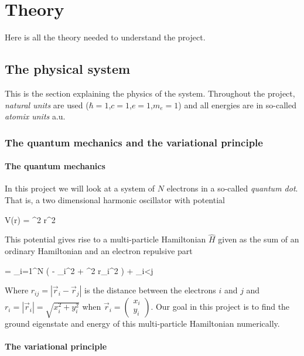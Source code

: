 \section{Theory}
Here is all the theory needed to understand the project.


\subsection{The physical system}
This is the section explaining the physics of the system. 
Throughout the project, \textit{natural units} are used ($\hbar = 1$,$c=1$,$e=1$,$m_e=1$) and all energies are in so-called \textit{atomix units} a.u. 

\subsubsection{The quantum mechanics and the variational principle} \label{sec:quantum_mechanics}

\paragraph{The quantum mechanics}

In this project we will look at a system of $N$ electrons in a so-called \textit{quantum dot}.
That is, a two dimensional harmonic oscillator with potential 

\eqs
V(\vec r) =  \omega^2 r^2
\label{eq:harmonic_oscillator_potential}
\eqf

This potential gives rise to a multi-particle Hamiltonian $\hat{H}$ given as the sum of an ordinary Hamiltonian and an electron repulsive part

\eqs
{} = \sum_{i=1}^N \left ( - \nabla_i^2 +  \omega^2 r_i^2 \right ) + \sum_{i<j}  
\label{eq:harmonic_oscillator_hamiltonian}
\eqf

Where $r_{ij} = |\vec r_i - \vec r_j| $ is the distance between the electrons $i$ and $j$ and $r_i = |\vec r_i | = \sqrt{x_i^2 + y_i^2}$ when $\vec r_i = \left ( \begin{matrix} x_i \\ y_i \end{matrix} \right ) $. 
Our goal in this project is to find the ground eigenstate and energy of this multi-particle Hamiltonian numerically. 

\paragraph{The variational principle}

